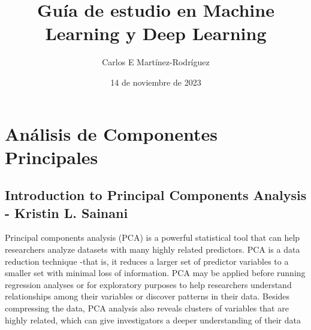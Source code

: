 \documentclass[12pt]{article}
\title{Gu\'ia de estudio en Machine Learning y  Deep Learning}
\author{Carlos E Mart\'inez-Rodr\'iguez}
\date{14  de noviembre de 2023}  %
\begin{document}
\maketitle
\tableofcontents
\newpage

\section{An\'alisis de Componentes Principales}

\subsection{Introduction to Principal Components Analysis - Kristin L.  Sainani}
Principal components analysis (PCA) is a powerful statistical tool that can help researchers analyze datasets with many highly related predictors. PCA is a data reduction technique -that is, it reduces a larger set of predictor variables to a smaller set with minimal loss of information. PCA may be applied before running regression analyses or for exploratory purposes to help researchers understand relationships among their variables or discover patterns in their data.  Besides compressing the data, PCA analysis also reveals clusters of variables that are highly related, which can give investigators a deeper understanding of their data
\end{document}
